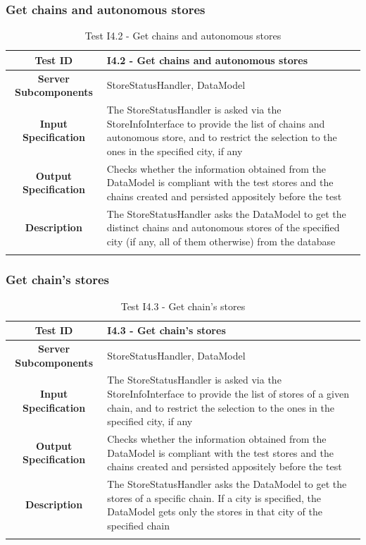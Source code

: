 \documentclass[a4paper,oneside,11pt]{book}
\begin{document}
    \subsubsection{Get chains and autonomous stores}
    \begin{longtable}[c]{|>{\bfseries{}}c|H{.5\textwidth}|}
        \hline
        Test ID & I4.2 - Get chains and autonomous stores \\ \hline
        Server Subcomponents & StoreStatusHandler, DataModel \\ \hline
        Input Specification & The StoreStatusHandler is asked via the StoreInfoInterface to provide the list of chains and autonomous store, and to restrict the selection to the ones in the specified city, if any \\ \hline
        Output Specification & Checks whether the information obtained from the DataModel is compliant with the test stores and the chains created and persisted appositely before the test \\ \hline
        Description & The StoreStatusHandler asks the DataModel to get the distinct chains and autonomous stores of the specified city (if any, all of them otherwise) from the database \\ \hline
        \caption{Test I4.2 - Get chains and autonomous stores}
        \label{table:test_I4.2}
    \end{longtable}
    
    \newpage
    \subsubsection{Get chain’s stores}
    \begin{longtable}[c]{|>{\bfseries{}}c|H{.5\textwidth}|}
        \hline
        Test ID & I4.3 - Get chain’s stores \\ \hline
        Server Subcomponents & StoreStatusHandler, DataModel \\ \hline
        Input Specification & The StoreStatusHandler is asked via the StoreInfoInterface to provide the list of stores of a given chain, and to restrict the selection to the ones in the specified city, if any \\ \hline
        Output Specification & Checks whether the information obtained from the DataModel is compliant with the test stores and the chains created and persisted appositely before the test \\ \hline
        Description & The StoreStatusHandler asks the DataModel to get the stores of a specific chain. If a city is specified, the DataModel gets only the stores in that city of the specified chain \\ \hline
        \caption{Test I4.3 - Get chain’s stores}
        \label{table:test_I4.3}
    \end{longtable}
    
\end{document}
